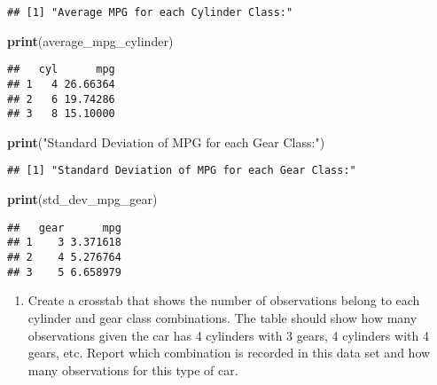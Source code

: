 \documentclass[
]{article}
\newenvironment{Shaded}{\begin{snugshade}}{\end{snugshade}}
\newcommand{\CommentTok}[1]{\textcolor[rgb]{0.56,0.35,0.01}{\textit{#1}}}
\newcommand{\FunctionTok}[1]{\textcolor[rgb]{0.13,0.29,0.53}{\textbf{#1}}}
\newcommand{\NormalTok}[1]{#1}
\newcommand{\OtherTok}[1]{\textcolor[rgb]{0.56,0.35,0.01}{#1}}
\newcommand{\SpecialCharTok}[1]{\textcolor[rgb]{0.81,0.36,0.00}{\textbf{#1}}}
\newcommand{\StringTok}[1]{\textcolor[rgb]{0.31,0.60,0.02}{#1}}
\providecommand{\tightlist}{%
  \setlength{\itemsep}{0pt}\setlength{\parskip}{0pt}}
\begin{document}
\begin{verbatim}
## [1] "Average MPG for each Cylinder Class:"
\end{verbatim}

\begin{Shaded}
\begin{Highlighting}[]
\FunctionTok{print}\NormalTok{(average\_mpg\_cylinder)}
\end{Highlighting}
\end{Shaded}

\begin{verbatim}
##   cyl      mpg
## 1   4 26.66364
## 2   6 19.74286
## 3   8 15.10000
\end{verbatim}

\begin{Shaded}
\begin{Highlighting}[]
\FunctionTok{print}\NormalTok{(}\StringTok{"Standard Deviation of MPG for each Gear Class:"}\NormalTok{)}
\end{Highlighting}
\end{Shaded}

\begin{verbatim}
## [1] "Standard Deviation of MPG for each Gear Class:"
\end{verbatim}

\begin{Shaded}
\begin{Highlighting}[]
\FunctionTok{print}\NormalTok{(std\_dev\_mpg\_gear)}
\end{Highlighting}
\end{Shaded}

\begin{verbatim}
##   gear      mpg
## 1    3 3.371618
## 2    4 5.276764
## 3    5 6.658979
\end{verbatim}

\begin{enumerate}
\def\labelenumi{\alph{enumi}.}
\setcounter{enumi}{4}
\tightlist
\item
  Create a crosstab that shows the number of observations belong to each
  cylinder and gear class combinations. The table should show how many
  observations given the car has 4 cylinders with 3 gears, 4 cylinders
  with 4 gears, etc. Report which combination is recorded in this data
  set and how many observations for this type of car.
\end{enumerate}

\begin{Shaded}
\end{Shaded}
\end{document}
